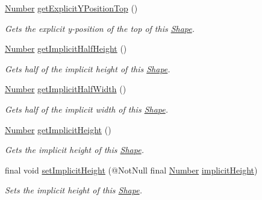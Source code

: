 \begin{DoxyCompactItemize}
\hyperlink{interfacecom_1_1aarrelaakso_1_1drawl_1_1_number}{Number} \hyperlink{classcom_1_1aarrelaakso_1_1drawl_1_1_shape_a8c65dff2026744ae10648de3908165e5}{get\+Explicit\+Y\+Position\+Top} ()
\begin{DoxyCompactList}\small\item\em Gets the explicit y-\/position of the top of this \hyperlink{classcom_1_1aarrelaakso_1_1drawl_1_1_shape}{Shape}. \end{DoxyCompactList}\item 
\hyperlink{interfacecom_1_1aarrelaakso_1_1drawl_1_1_number}{Number} \hyperlink{classcom_1_1aarrelaakso_1_1drawl_1_1_shape_a4af0fd7e309ea01bced73076510ef897}{get\+Implicit\+Half\+Height} ()
\begin{DoxyCompactList}\small\item\em Gets half of the implicit height of this \hyperlink{classcom_1_1aarrelaakso_1_1drawl_1_1_shape}{Shape}. \end{DoxyCompactList}\item 
\hyperlink{interfacecom_1_1aarrelaakso_1_1drawl_1_1_number}{Number} \hyperlink{classcom_1_1aarrelaakso_1_1drawl_1_1_shape_a02d73887a309bcd1178b142ad0c7edd9}{get\+Implicit\+Half\+Width} ()
\begin{DoxyCompactList}\small\item\em Gets half of the implicit width of this \hyperlink{classcom_1_1aarrelaakso_1_1drawl_1_1_shape}{Shape}. \end{DoxyCompactList}\item 
\hyperlink{interfacecom_1_1aarrelaakso_1_1drawl_1_1_number}{Number} \hyperlink{classcom_1_1aarrelaakso_1_1drawl_1_1_shape_a3b0ad73b41fe8c9ae66d20f7fc1de7c9}{get\+Implicit\+Height} ()
\begin{DoxyCompactList}\small\item\em Gets the implicit height of this \hyperlink{classcom_1_1aarrelaakso_1_1drawl_1_1_shape}{Shape}. \end{DoxyCompactList}\item 
final void \hyperlink{classcom_1_1aarrelaakso_1_1drawl_1_1_shape_a608e72be0fb16380e5fda14564c46739}{set\+Implicit\+Height} (@Not\+Null final \hyperlink{interfacecom_1_1aarrelaakso_1_1drawl_1_1_number}{Number} \hyperlink{classcom_1_1aarrelaakso_1_1drawl_1_1_shape_a9270317569c41e7f3f3fbe6e71df86e6}{implicit\+Height})
\begin{DoxyCompactList}\small\item\em Sets the implicit height of this \hyperlink{classcom_1_1aarrelaakso_1_1drawl_1_1_shape}{Shape}. \end{DoxyCompactList}\item 

\end{DoxyCompactItemize}
